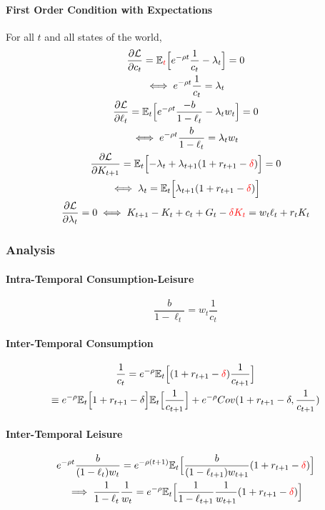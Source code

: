 \documentclass[11pt]{article}
\newcommand{\expat}[2]{\mathbb{E}_{#1}\Big[{#2}\Big]}
\begin{document}
			\paragraph{First Order Condition with Expectations}
			For all $t$ and all states of the world,
			\begin{gather}
				\pd{\mc{L}}{c_t} = \expat{\textcolor{red}{t}}{e^{-\rho t}\frac{1}{c_t} - \lambda_t} = 0 \\
				\iff e^{-\rho t} \frac{1}{c_t} = \lambda_t \\
				\pd{\mc{L}}{\ell_t} = \expat{t}{e^{-\rho t} \frac{-b}{1-\ell_t} - \lambda_t w_t} = 0 \\
				\iff e^{-\rho t} \frac{b}{1-\ell_t} = \lambda_t w_t \\
				\pd{\mc{L}}{K_{t+1}} = \expat{t}{-\lambda_t + \lambda_{t+1}(1 + r_{t+1} - \textcolor{red}{\delta})} = 0 \\
				\iff \lambda_t = \expat{t}{\lambda_{t+1}(1+r_{t+1} - \textcolor{red}{\delta})} \\
				\pd{\mc{L}}{\lambda_t} = 0 \iff K_{t+1} - K_t + c_t + G_t - \textcolor{red}{\delta K_t}= w_t \ell_t + r_t K_t
			\end{gather}
		\subsubsection{Analysis}
			\paragraph{Intra-Temporal Consumption-Leisure}
			\begin{equation}
				\frac{b}{1-\ell_t} = w_t\frac{1}{c_t}
			\end{equation}
			
			\paragraph{Inter-Temporal Consumption}
			\begin{gather}
				\frac{1}{c_t} = e^{-\rho} \expat{t}{(1 + r_{t+1} - \textcolor{red}{\delta})\frac{1}{c_{t+1}}} \\
				\equiv e^{-\rho} \expat{t}{1+r_{t+1}-\delta}\expat{t}{\frac{1}{c_{t+1}}} + e^{-\rho} Cov(1+r_{t+1}-\delta, \frac{1}{c_{t+1}})
			\end{gather}
			
			\paragraph{Inter-Temporal Leisure}
			\begin{gather}
				e^{-\rho t} \frac{b}{(1-\ell_t) w_t} = e^{-\rho (t+1)} \expat{t}{\frac{b}{(1-\ell_{t+1})w_{t+1}} (1 + r_{t+1} - \textcolor{red}{\delta})} \\
				\implies \frac{1}{1-\ell_t} \frac{1}{w_t} = e^{-\rho} \expat{t}{\frac{1}{1-\ell_{t+1}}\frac{1}{w_{t+1}} (1 + r_{t+1} - \textcolor{red}{\delta})}
			\end{gather}
\end{document}
